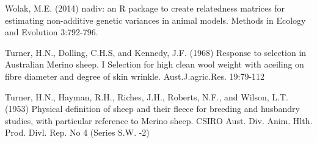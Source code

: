 \documentclass[titlepage]{article}  %
\begin{document}
\begin{thebibliography}{99}
Wolak, M.E. (2014) nadiv: an R package to create relatedness matrices for
    estimating non-additive genetic variances in animal models.
    Methods in Ecology and Evolution 3:792-796.

Turner, H.N., Dolling, C.H.S, and Kennedy, J.F. (1968) Response to selection in Australian Merino sheep. I Selection for high clean wool weight with aceiling on fibre diameter and degree of skin wrinkle. Aust.J.agric.Res. 19:79-112

Turner, H.N., Hayman, R.H., Riches, J.H., Roberts, N.F., and Wilson, L.T. (1953) Physical definition of sheep and their fleece for breeding and husbandry studies, with particular reference to Merino sheep. CSIRO Aust. Div. Anim. Hlth. Prod. Divl. Rep. No 4 (Series S.W. -2)

\end{thebibliography}
\end{document}

